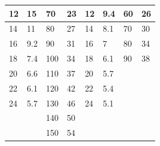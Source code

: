 \documentclass{article}
\begin{document}
\begin{table}[h!]
\begin{tabular}{llllllll}
        \multicolumn{1}{|l|}{12 }           & \multicolumn{1}{|l|}{15 }           & \multicolumn{1}{|l|}{70 }       & \multicolumn{1}{|l|}{23 }       & \multicolumn{1}{|l|}{12} & \multicolumn{1}{|l|}{9.4} & \multicolumn{1}{|l|}{60} & \multicolumn{1}{|l|}{26}  \\\hline
        \multicolumn{1}{|l|}{14 }           & \multicolumn{1}{|l|}{11 }           & \multicolumn{1}{|l|}{80 }       & \multicolumn{1}{|l|}{27 }       & \multicolumn{1}{|l|}{14} & \multicolumn{1}{|l|}{8.1} & \multicolumn{1}{|l|}{70} & \multicolumn{1}{|l|}{30}  \\\hline
        \multicolumn{1}{|l|}{16 }           & \multicolumn{1}{|l|}{9.2}           & \multicolumn{1}{|l|}{90 }       & \multicolumn{1}{|l|}{31 }       & \multicolumn{1}{|l|}{16} & \multicolumn{1}{|l|}{7  } & \multicolumn{1}{|l|}{80} & \multicolumn{1}{|l|}{34}  \\\hline
        \multicolumn{1}{|l|}{18 }           & \multicolumn{1}{|l|}{7.4}           & \multicolumn{1}{|l|}{100}       & \multicolumn{1}{|l|}{34 }       & \multicolumn{1}{|l|}{18} & \multicolumn{1}{|l|}{6.1} & \multicolumn{1}{|l|}{90} & \multicolumn{1}{|l|}{38}  \\\hline
        \multicolumn{1}{|l|}{20 }           & \multicolumn{1}{|l|}{6.6}           & \multicolumn{1}{|l|}{110}       & \multicolumn{1}{|l|}{37 }       & \multicolumn{1}{|l|}{20} & \multicolumn{1}{|l|}{5.7} &                          &                           \\\cline{1-6}
        \multicolumn{1}{|l|}{22 }           & \multicolumn{1}{|l|}{6.1}           & \multicolumn{1}{|l|}{120}       & \multicolumn{1}{|l|}{42 }       & \multicolumn{1}{|l|}{22} & \multicolumn{1}{|l|}{5.4} &                          &                           \\\cline{1-6}
        \multicolumn{1}{|l|}{24 }           & \multicolumn{1}{|l|}{5.7}           & \multicolumn{1}{|l|}{130}       & \multicolumn{1}{|l|}{46 }       & \multicolumn{1}{|l|}{24} & \multicolumn{1}{|l|}{5.1} &                          &                           \\\cline{1-6}
                                            &                                     & \multicolumn{1}{|l|}{140}       & \multicolumn{1}{|l|}{50 }       &                          &                           &                          &                           \\\cline{3-4}
                                            &                                     & \multicolumn{1}{|l|}{150}       & \multicolumn{1}{|l|}{54 }       &                          &                           &                          &                           \\\cline{3-4}

\end{tabular}
\end{table}
\end{document}
